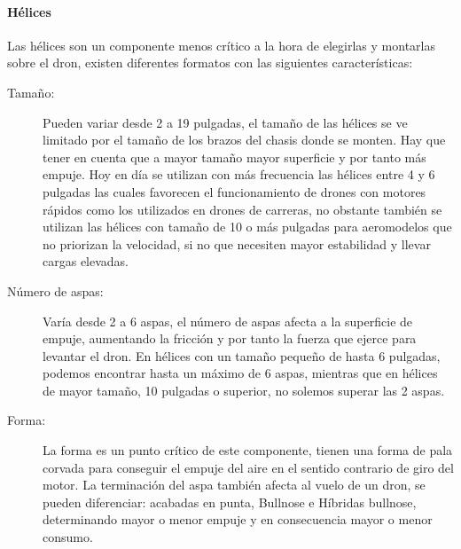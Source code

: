  
\paragraph{Hélices}
\label{SSS:Helices}

 Las hélices son un componente menos crítico a la hora de elegirlas y montarlas sobre el dron, existen diferentes formatos con las siguientes características:
 \begin{description}
        \item[Tamaño:] Pueden variar desde 2 a 19 pulgadas, el tamaño de las hélices se ve limitado por el tamaño de los brazos del chasis donde se monten. Hay que tener en cuenta que a mayor tamaño mayor superficie y por tanto más empuje. Hoy en día se utilizan con más frecuencia las hélices entre 4 y 6 pulgadas las cuales favorecen el funcionamiento de drones con motores rápidos como los utilizados en drones de carreras, no obstante también se utilizan las hélices con tamaño de 10 o más pulgadas para aeromodelos que no priorizan la velocidad, si no que necesiten mayor estabilidad y llevar cargas elevadas.
 		\item[Número de aspas:] Varía desde 2 a 6 aspas, el número de aspas afecta a la superficie de empuje, aumentando la fricción y por tanto la fuerza que ejerce para levantar el dron. En hélices con un  tamaño pequeño de hasta 6 pulgadas, podemos encontrar hasta un máximo de 6 aspas, mientras que en hélices de mayor tamaño, 10 pulgadas o superior, no solemos superar las 2 aspas.
 		\item[Forma:] La forma es un punto crítico de este componente, tienen una forma de pala corvada para conseguir el empuje del aire en el sentido contrario de giro del motor. La terminación del aspa también afecta al vuelo de un dron, se pueden diferenciar: acabadas en punta,  Bullnose e Híbridas bullnose, determinando mayor o menor empuje y en consecuencia mayor o menor consumo.

 
 \end{description}
 

